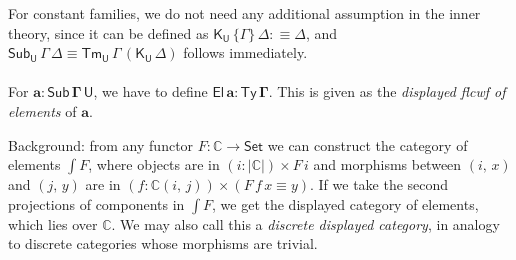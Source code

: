 \documentclass[12pt,a4paper,twoside,openany]{book}
\theoremstyle{remark}
\theoremstyle{definition}
\theoremstyle{theorem}
\newcommand{\mbb}[1]{\mathbb{#1}}
\newcommand{\bs}[1]{\boldsymbol{#1}}
\newcommand{\Sub}{\mathsf{Sub}}
\newcommand{\Tm}{\mathsf{Tm}}
\newcommand{\Ty}{\mathsf{Ty}}
\newcommand{\U}{\mathsf{U}}
\newcommand{\El}{\mathsf{El}}
\newcommand{\Set}{\mathsf{Set}}
\newcommand{\K}{\mathsf{K}}
\newcommand{\ba}{\bs{a}}
\newcommand{\bU}{\bs{\U}}
\newcommand{\mbbC}{\mbb{C}}
\newcommand{\defn}{:\equiv}
\begin{document}
For constant families, we do not need any additional assumption in the inner
theory, since it can be defined as $\K_{\bU}\,\{\Gamma\}\,\Delta \defn \Delta$,
and $\Sub_{\bU}\,\Gamma\,\Delta \equiv \Tm_{\bU}\,\Gamma\,(\K_{\bU}\,\Delta)$
follows immediately.
\\\\
\indent For $\bs{a : \Sub\,\Gamma\,\U}$, we have to define $\bs{\El\,a :
  \Ty\,\Gamma}$. This is given as the \emph{displayed flcwf of elements} of
$\ba$.

Background: from any functor $F : \mbbC \to \bs{\Set}$ we can construct the
category of elements $\int\!F$, where objects are in $(i : |\mbbC|) \times F\,i$
and morphisms between $(i,\,x)$ and $(j,\,y)$ are in $(f : \mbbC(i,\,j)) \times
(F\,f\,x \equiv y)$. If we take the second projections of components in $\int\!F$,
we get the displayed category of elements, which lies over $\mbbC$. We may also call
this a \emph{discrete displayed category}, in analogy to discrete categories whose
morphisms are trivial.
\end{document}
